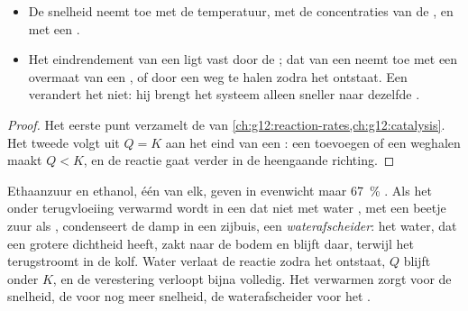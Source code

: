 \begin{proposition}\label{prop:g12:synthesis-strategy:levers}
\begin{itemize}
  \item De snelheid neemt toe met de temperatuur, met de concentraties
        van de , en met een .
  \item Het eindrendement van een  ligt vast door de
        ; dat van een  neemt toe
        met een overmaat van een , of door een  weg
        te halen zodra het ontstaat. Een  verandert het niet:
        hij brengt het systeem alleen sneller naar dezelfde .
\end{itemize}
\end{proposition}

\begin{proof}
Het eerste punt verzamelt de  van
\cref{ch:g12:reaction-rates,ch:g12:catalysis}. Het tweede volgt uit
$Q = K$ aan het eind van een : een 
toevoegen of een  weghalen maakt $Q < K$, en de reactie gaat
verder in de heengaande richting.
\end{proof}

\begin{example}\label{ex:g12:synthesis-strategy:trap}
Ethaanzuur en ethanol, één  van elk, geven in evenwicht maar
\qty{67}{\percent} . Als het  onder terugvloeiing verwarmd
wordt in een  dat niet met water , met een beetje zuur
als , condenseert de damp in een zijbuis, een
\emph{waterafscheider}: het water, dat een grotere dichtheid heeft, zakt
naar de bodem en blijft daar, terwijl het  terugstroomt in de
kolf. Water verlaat de reactie zodra het ontstaat, $Q$ blijft onder $K$,
en de verestering verloopt bijna volledig. Het verwarmen zorgt voor de
snelheid, de  voor nog meer snelheid, de waterafscheider voor
het .
\end{example}


